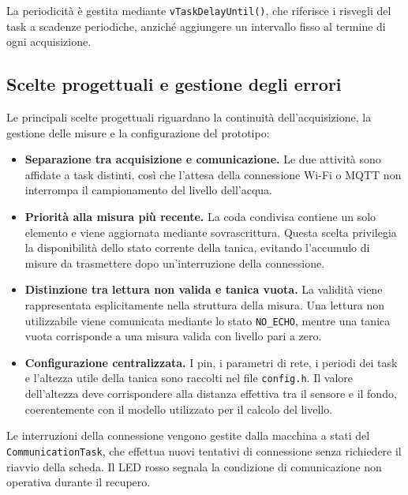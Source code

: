 La periodicità è gestita mediante \texttt{vTaskDelayUntil()},
che riferisce i risvegli del task a scadenze periodiche,
anziché aggiungere un intervallo fisso al termine
di ogni acquisizione.


\subsection{Scelte progettuali e gestione degli errori}
\label{subsec:tms-design-choices}

Le principali scelte progettuali riguardano la continuità
dell'acquisizione, la gestione delle misure e la configurazione
del prototipo:

\begin{itemize}
    \item \textbf{Separazione tra acquisizione e comunicazione.}
    Le due attività sono affidate a task distinti, così che
    l'attesa della connessione Wi-Fi o MQTT non interrompa
    il campionamento del livello dell'acqua.

    \item \textbf{Priorità alla misura più recente.}
    La coda condivisa contiene un solo elemento e viene
    aggiornata mediante sovrascrittura.
    Questa scelta privilegia la disponibilità dello stato
    corrente della tanica, evitando l'accumulo di misure
    da trasmettere dopo un'interruzione della connessione.

    \item \textbf{Distinzione tra lettura non valida
    e tanica vuota.}
    La validità viene rappresentata esplicitamente
    nella struttura della misura.
    Una lettura non utilizzabile viene comunicata mediante
    lo stato \texttt{NO\_ECHO}, mentre una tanica vuota
    corrisponde a una misura valida con livello pari a zero.

    \item \textbf{Configurazione centralizzata.}
    I pin, i parametri di rete, i periodi dei task
    e l'altezza utile della tanica sono raccolti
    nel file \texttt{config.h}.
    Il valore dell'altezza deve corrispondere alla distanza
    effettiva tra il sensore e il fondo, coerentemente
    con il modello utilizzato per il calcolo del livello.
\end{itemize}

Le interruzioni della connessione vengono gestite
dalla macchina a stati del \texttt{CommunicationTask},
che effettua nuovi tentativi di connessione senza richiedere
il riavvio della scheda.
Il LED rosso segnala la condizione di comunicazione
non operativa durante il recupero.


